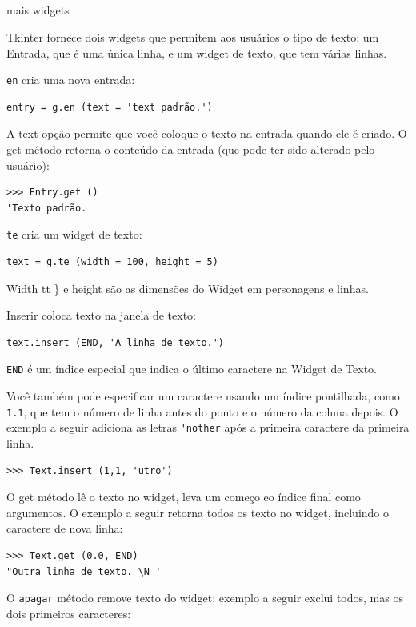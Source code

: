 \documentclass[10pt]{book}
\begin{document}
\begin{v erbatim}
\section{} mais widgets

Tkinter fornece dois widgets que permitem aos usuários o tipo de texto: um
Entrada, que é uma única linha, e um widget de texto, que tem
várias linhas.

{\tt en} cria uma nova entrada:

\begin{verbatim}
entry = g.en (text = 'text padrão.')
\end{verbatim}
%
A {text \tt} opção permite que você coloque o texto na entrada
quando ele é criado. O {get \tt} método retorna o conteúdo
da entrada (que pode ter sido alterado pelo usuário):

\begin{verbatim}
>>> Entry.get ()
'Texto padrão.
\end{verbatim}
%
{\tt te} cria um widget de texto:

\begin{verbatim}
text = g.te (width = 100, height = 5)
\end{verbatim}
%
{Width tt \} e {height \tt} são as dimensões do
Widget em personagens e linhas.

{Inserir \tt} coloca texto na janela de texto:

\begin{verbatim}
text.insert (END, 'A linha de texto.')
\end{verbatim}
%
{\tt END} é um índice especial que indica o último caractere na
Widget de Texto.

Você também pode especificar um caractere usando um índice pontilhada, como {\tt 1.1},
que tem o número de linha antes do ponto e o número da coluna depois.
O exemplo a seguir adiciona as letras \verb "'nother" após a primeira
caractere da primeira linha.

\begin{verbatim}
>>> Text.insert (1,1, 'utro')
\end{verbatim}
%
O {get \tt} método lê o texto no widget, leva um começo
eo índice final como argumentos. O exemplo a seguir retorna todos os
texto no widget, incluindo o caractere de nova linha:

\begin{verbatim}
>>> Text.get (0.0, END)
"Outra linha de texto. \N '
\end{verbatim}
%
O {\tt apagar} método remove texto do widget;
exemplo a seguir exclui todos, mas os dois primeiros caracteres:

}
\end{v erbatim}
\end{document}
